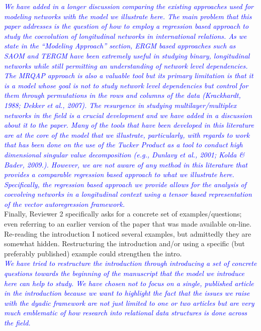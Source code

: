 \textcolor{blue}{\emph{
	We have added in a longer discussion comparing the existing approaches used for modeling networks with the model we illustrate here. The main problem that this paper addresses is the question of how to employ a regression based approach to study the coevolution of longitudinal networks in international relations. As we state in the ``Modeling Approach'' section, ERGM based approaches such as SAOM and TERGM have been extremely useful in studying binary, longitudinal networks while still permitting an understanding of network level dependencies. The MRQAP approach is also a valuable tool but its primary limitation is that it is a model whose goal is not to study network level dependencies but control for them through permutations in the rows and columns of the data (Krackhardt, 1988; Dekker et al., 2007). The resurgence in studying multilayer/multiplex networks in the field is a crucial development and we have added in a discussion about it to the paper. Many of the tools that have been developed in this literature are at the core of the model that we illustrate, particularly, with regards to work that has been done on the use of the Tucker Product as a tool to conduct high dimensional singular value decomposition (e.g., Dunlavy et al., 2001; Kolda \& Bader, 2009.). However, we are not aware of any method in this literature that provides a comparable regression based approach to what we illustrate here. Specifically, the regression based approach we provide allows for the analysis of coevolving networks in a longitudinal context using a tensor based representation of the vector autoregression framework. 
}} \\

Finally, Reviewer 2 specifically asks for a concrete set of examples/questions; even referring to an earlier version of the paper that was made available on-line. Re-reading the introduction I noticed several examples, but admittedly they are somewhat hidden. Restructuring the introduction and/or using a specific (but preferably published) example could strengthen the intro. \\

\textcolor{blue}{\emph{
	We have tried to restructure the introduction through introducing a set of concrete questions towards the beginning of the manuscript that the model we introduce here can help to study. We have chosen not to focus on a single, published article in the introduction because we want to highlight the fact that the issues we raise with the dyadic framework are not just limited to one or two articles but are very much emblematic of how research into relational data structures is done across the field.
}} \\
